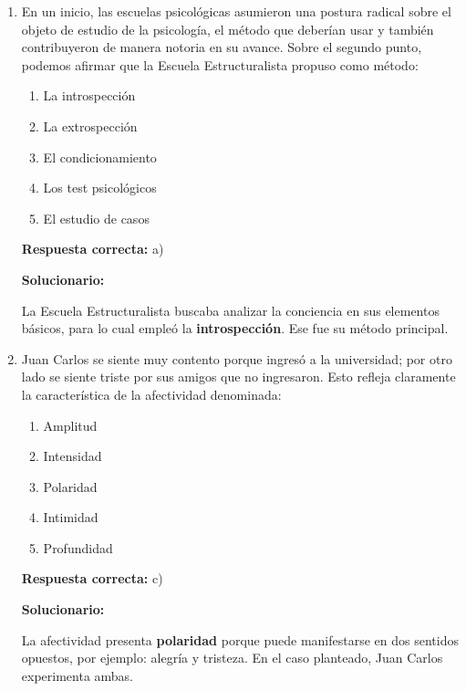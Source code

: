 \begin{enumerate}[resume]
	
	\item En un inicio, las escuelas psicológicas asumieron una postura radical sobre el objeto de estudio de la psicología, el método que deberían usar y también contribuyeron de manera notoria en su avance. Sobre el segundo punto, podemos afirmar que la Escuela Estructuralista propuso como método:
	\begin{enumerate}[label=\alph*)]
		\item La introspección
		\item La extrospección
		\item El condicionamiento
		\item Los test psicológicos
		\item El estudio de casos
	\end{enumerate}
	\textbf{Respuesta correcta:} a)
	
	\vspace{2mm}
	\textbf{Solucionario:}
	
	La Escuela Estructuralista buscaba analizar la conciencia en sus elementos básicos, para lo cual empleó la \textbf{introspección}.  
	Ese fue su método principal.
	
	\vspace{6mm}
	
	\item Juan Carlos se siente muy contento porque ingresó a la universidad; por otro lado se siente triste por sus amigos que no ingresaron. Esto refleja claramente la característica de la afectividad denominada:
	\begin{enumerate}[label=\alph*)]
		\item Amplitud
		\item Intensidad
		\item Polaridad
		\item Intimidad
		\item Profundidad
	\end{enumerate}
	\textbf{Respuesta correcta:} c)
	
	\vspace{2mm}
	\textbf{Solucionario:}
	
	La afectividad presenta \textbf{polaridad} porque puede manifestarse en dos sentidos opuestos, por ejemplo: alegría y tristeza.  
	En el caso planteado, Juan Carlos experimenta ambas.
	
	\vspace{6mm}
	

\end{enumerate}
